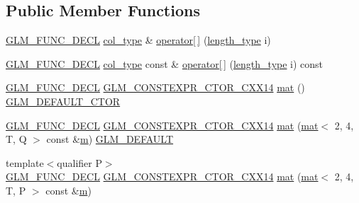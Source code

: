 \subsection*{Public Member Functions}
\begin{DoxyCompactItemize}
\item 
\hyperlink{setup_8hpp_ab2d052de21a70539923e9bcbf6e83a51}{G\+L\+M\+\_\+\+F\+U\+N\+C\+\_\+\+D\+E\+CL} \hyperlink{structglm_1_1mat_3_012_00_014_00_01_t_00_01_q_01_4_ae14ad10a9d8ce3908ec89ae373a27872}{col\+\_\+type} \& \hyperlink{structglm_1_1mat_3_012_00_014_00_01_t_00_01_q_01_4_a30332bf17d9c1668fcdc80e301cfe118}{operator\mbox{[}$\,$\mbox{]}} (\hyperlink{structglm_1_1mat_3_012_00_014_00_01_t_00_01_q_01_4_a5295c484627e965d615f3367c2ca45d8}{length\+\_\+type} i)
\item 
\hyperlink{setup_8hpp_ab2d052de21a70539923e9bcbf6e83a51}{G\+L\+M\+\_\+\+F\+U\+N\+C\+\_\+\+D\+E\+CL} \hyperlink{structglm_1_1mat_3_012_00_014_00_01_t_00_01_q_01_4_ae14ad10a9d8ce3908ec89ae373a27872}{col\+\_\+type} const  \& \hyperlink{structglm_1_1mat_3_012_00_014_00_01_t_00_01_q_01_4_af5ccda8342646f7dea9fec3ed9088607}{operator\mbox{[}$\,$\mbox{]}} (\hyperlink{structglm_1_1mat_3_012_00_014_00_01_t_00_01_q_01_4_a5295c484627e965d615f3367c2ca45d8}{length\+\_\+type} i) const
\item 
\hyperlink{setup_8hpp_ab2d052de21a70539923e9bcbf6e83a51}{G\+L\+M\+\_\+\+F\+U\+N\+C\+\_\+\+D\+E\+CL} \hyperlink{setup_8hpp_a0900f9145e68bf6061b6f5e7be3fa751}{G\+L\+M\+\_\+\+C\+O\+N\+S\+T\+E\+X\+P\+R\+\_\+\+C\+T\+O\+R\+\_\+\+C\+X\+X14} \hyperlink{structglm_1_1mat_3_012_00_014_00_01_t_00_01_q_01_4_a7fc67ba4ee21331632e9da37cec2a96e}{mat} () \hyperlink{setup_8hpp_afb97a4e995bc004c0cbbfa22125b80ba}{G\+L\+M\+\_\+\+D\+E\+F\+A\+U\+L\+T\+\_\+\+C\+T\+OR}
\item 
\hyperlink{setup_8hpp_ab2d052de21a70539923e9bcbf6e83a51}{G\+L\+M\+\_\+\+F\+U\+N\+C\+\_\+\+D\+E\+CL} \hyperlink{setup_8hpp_a0900f9145e68bf6061b6f5e7be3fa751}{G\+L\+M\+\_\+\+C\+O\+N\+S\+T\+E\+X\+P\+R\+\_\+\+C\+T\+O\+R\+\_\+\+C\+X\+X14} \hyperlink{structglm_1_1mat_3_012_00_014_00_01_t_00_01_q_01_4_a78af7c89ef6af64cc6c24b6764a3099c}{mat} (\hyperlink{structglm_1_1mat}{mat}$<$ 2, 4, T, Q $>$ const \&\hyperlink{_s_d_l__opengl__glext_8h_af593500c283bf1a787a6f947f503a5c2}{m}) \hyperlink{setup_8hpp_aefce7051c376a64ba89fa93a9f63bc2c}{G\+L\+M\+\_\+\+D\+E\+F\+A\+U\+LT}
\item 
{\footnotesize template$<$qualifier P$>$ }\\\hyperlink{setup_8hpp_ab2d052de21a70539923e9bcbf6e83a51}{G\+L\+M\+\_\+\+F\+U\+N\+C\+\_\+\+D\+E\+CL} \hyperlink{setup_8hpp_a0900f9145e68bf6061b6f5e7be3fa751}{G\+L\+M\+\_\+\+C\+O\+N\+S\+T\+E\+X\+P\+R\+\_\+\+C\+T\+O\+R\+\_\+\+C\+X\+X14} \hyperlink{structglm_1_1mat_3_012_00_014_00_01_t_00_01_q_01_4_a5401c74b80f80ee197c8e83e3003cfe9}{mat} (\hyperlink{structglm_1_1mat}{mat}$<$ 2, 4, T, P $>$ const \&\hyperlink{_s_d_l__opengl__glext_8h_af593500c283bf1a787a6f947f503a5c2}{m})

\end{DoxyCompactItemize}
